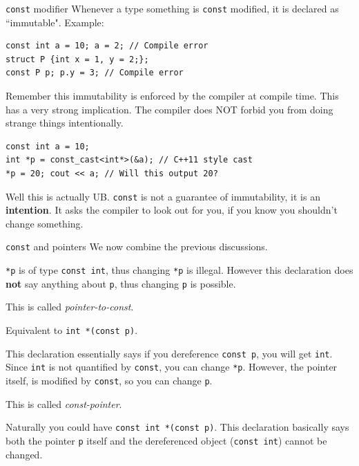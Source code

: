 \begin{frame}[fragile]{\texttt{const} modifier}
Whenever a type something is \texttt{const} modified, it is declared as ``immutable". Example:

\begin{verbatim}
const int a = 10; a = 2; // Compile error
struct P {int x = 1, y = 2;};
const P p; p.y = 3; // Compile error
\end{verbatim}

Remember this immutability is enforced by the compiler at compile time. This has a very strong implication. The compiler does NOT forbid you from doing strange things intentionally.

\begin{verbatim}
const int a = 10; 
int *p = const_cast<int*>(&a); // C++11 style cast
*p = 20; cout << a; // Will this output 20?
\end{verbatim}

Well this is actually UB. \texttt{const} is not a guarantee of immutability, it is an \textbf{intention}. It asks the compiler to look out for you, if you know you shouldn't change something.
\end{frame}

\begin{frame}{\texttt{const} and pointers}
	We now combine the previous discussions. 
	
	\begin{description}
		\item[\texttt{const int *p}] \texttt{*p} is of type \texttt{const int}, thus changing \texttt{*p} is illegal. However this declaration does \textbf{not} say anything about \texttt{p}, thus changing \texttt{p} is possible. 
		
		This is called \textit{pointer-to-const}.
		
		\item[\texttt{int *const p}] Equivalent to \texttt{int *(const p)}.
		\item[\texttt{int *(const p)}] This declaration essentially says if you dereference \texttt{const p}, you will get \texttt{int}. Since \texttt{int} is not quantified by \texttt{const}, you can change \texttt{*p}. However, the pointer itself, is modified by \texttt{const}, so you can change \texttt{p}.
		
		This is called \textit{const-pointer}.
	\end{description}
	
	Naturally you could have \texttt{const int *(const p)}. This declaration basically says both the pointer \texttt{p} itself and the dereferenced object (\texttt{const int}) cannot be changed.
\end{frame}


